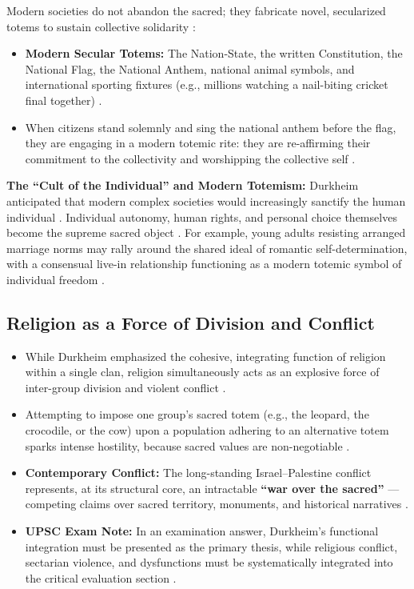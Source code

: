 Modern societies do not abandon the sacred; they fabricate novel, secularized totems to sustain collective solidarity :
\begin{itemize}
    \item \textbf{Modern Secular Totems:} The Nation-State, the written Constitution, the National Flag, the National Anthem, national animal symbols, and international sporting fixtures (e.g., millions watching a nail-biting cricket final together) .
    \item When citizens stand solemnly and sing the national anthem before the flag, they are engaging in a modern totemic rite: they are re-affirming their commitment to the collectivity and worshipping the collective self .
\end{itemize}

\begin{KeyConcept}
\textbf{The ``Cult of the Individual'' and Modern Totemism:}
Durkheim anticipated that modern complex societies would increasingly sanctify the human individual . Individual autonomy, human rights, and personal choice themselves become the supreme sacred object . For example, young adults resisting arranged marriage norms may rally around the shared ideal of romantic self-determination, with a consensual live-in relationship functioning as a modern totemic symbol of individual freedom .
\end{KeyConcept}

\subsection{Religion as a Force of Division and Conflict}

\begin{CriticalPoint}
\begin{itemize}
    \item While Durkheim emphasized the cohesive, integrating function of religion within a single clan, religion simultaneously acts as an explosive force of inter-group division and violent conflict .
    \item Attempting to impose one group's sacred totem (e.g., the leopard, the crocodile, or the cow) upon a population adhering to an alternative totem sparks intense hostility, because sacred values are non-negotiable .
    \item \textbf{Contemporary Conflict:} The long-standing Israel--Palestine conflict represents, at its structural core, an intractable \textbf{``war over the sacred''} --- competing claims over sacred territory, monuments, and historical narratives .
    \item \textbf{UPSC Exam Note:} In an examination answer, Durkheim's functional integration must be presented as the primary thesis, while religious conflict, sectarian violence, and dysfunctions must be systematically integrated into the critical evaluation section .
\end{itemize}
\end{CriticalPoint}

